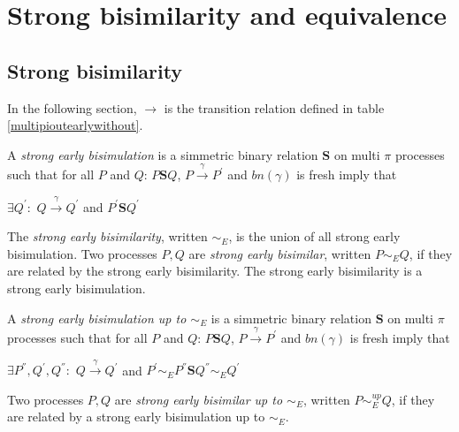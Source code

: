 \section{Strong bisimilarity and equivalence}
\subsection{Strong bisimilarity}

In the following section, $\rightarrow$ is the transition relation defined in table \ref{multipioutearlywithout}.

\begin{definition}\label{strongEarlyBisimulation}
  A \emph{strong early bisimulation} is a simmetric binary relation $\mathbf{S}$ on multi $\pi$ processes such that for all $P$ and $Q$: $P \mathbf{S} Q$, $P \xrightarrow{\gamma} P^{'}$ and $bn(\gamma)$ is fresh imply that
  \begin{center}
    $\exists Q^{'}:$ $Q \xrightarrow{\gamma} Q^{'}$ and $P^{'}\mathbf{S} Q^{'}$
  \end{center}
  The \emph{strong early bisimilarity}, written $\sim_{E}$, is the union of all strong early bisimulation. Two processes $P,Q$ are \emph{strong early bisimilar}, written $P \sim_{E} Q$, if they are related by the strong early bisimilarity. The strong early bisimilarity is a strong early bisimulation.
\end{definition}

\begin{definition}\label{strongEarlyBisimulationUpTo}
  A \emph{strong early bisimulation up to $\sim_{E}$} is a simmetric binary relation $\mathbf{S}$ on multi $\pi$ processes such that for all $P$ and $Q$: $P \mathbf{S} Q$, $P \xrightarrow{\gamma} P^{'}$ and $bn(\gamma)$ is fresh imply that
  \begin{center}
    $\exists P^{''},Q^{'},Q^{''}:$ $Q \xrightarrow{\gamma} Q^{'}$ and $P^{'} \sim_{E} P^{''} \mathbf{S} Q^{''} \sim_{E} Q^{'} $
  \end{center}
  Two processes $P,Q$ are \emph{strong early bisimilar up to $\sim_{E}$}, written $P \sim_{E}^{up} Q$, if they are related by a strong early bisimulation up to $\sim_{E}$.
\end{definition}


